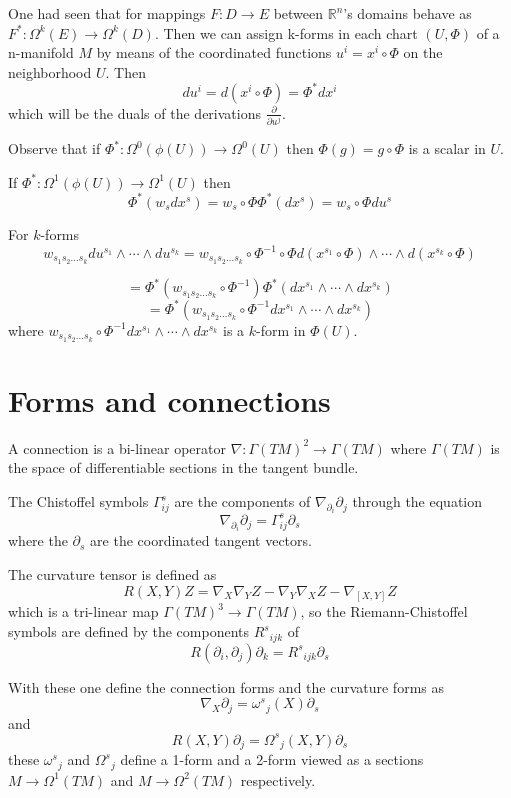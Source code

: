 \documentclass[12pt]{article}
\begin{document}
One had seen that for mappings $F\colon D\to E$ between $\mathbb{R}^n$'s domains behave as $F^*\colon \Omega^k(E)\to\Omega^k(D)$. 
Then we can assign k-forms in each chart $(U,\Phi)$ of a n-manifold $M$
by means of the coordinated functions $u^i=x^i\circ\Phi$ on the neighborhood $U$.
Then
$$du^i=d(x^i\circ\Phi)=\Phi^*dx^i$$
which will be the duals of the derivations
$\frac{\partial}{\partial u^j}$.  

Observe that if $\Phi^*\colon\Omega^0(\phi(U))\to\Omega^0(U)$
then $\Phi(g)=g\circ\Phi$ is a scalar in $U$.

If $\Phi^*\colon\Omega^1(\phi(U))\to\Omega^1(U)$ then
$$\Phi^*(w_sdx^s)=w_s\circ\Phi \Phi^*(dx^s)=w_s\circ\Phi du^s$$

For $k$-forms 
$$
w_{s_1s_2...s_k}du^{s_1}\wedge\cdots \wedge du^{s_k}=
w_{s_1s_2...s_k}\circ\Phi^{-1}\circ\Phi
d(x^{s_1}\circ\Phi)\wedge\cdots \wedge d(x^{s_k}\circ\Phi)$$

$$=\Phi^*(w_{s_1s_2...s_k}\circ\Phi^{-1})
\Phi^*(dx^{s_1}\wedge\cdots\wedge dx^{s_k})$$
$$=\Phi^*(w_{s_1s_2...s_k}\circ\Phi^{-1}dx^{s_1}\wedge\cdots\wedge dx^{s_k})$$
where $w_{s_1s_2...s_k}\circ\Phi^{-1}dx^{s_1}\wedge\cdots\wedge dx^{s_k}$ is a $k$-form in $\Phi(U)$.

\section{\bf Forms and connections}

A connection is a bi-linear operator $\nabla:\Gamma(TM)^2\to \Gamma(TM)$ where $\Gamma(TM)$ is the space of differentiable sections in the tangent bundle.

The Chistoffel symbols $\Gamma^s_{ij}$ are the components of $\nabla_{\partial_i}\partial_j$ through the equation
$$\nabla_{\partial_i}\partial_j=\Gamma^s_{ij}\partial_s$$
where the $\partial_s$ are the coordinated tangent vectors.

The curvature tensor is defined as 
$$R(X,Y)Z=\nabla_X\nabla_YZ-\nabla_Y\nabla_XZ-\nabla_{[X,Y]}Z$$
which is a tri-linear map $\Gamma(TM)^3\to \Gamma(TM)$, so the Riemann-Chistoffel symbols are defined by the components ${R^s}_{ijk}$ of
$$R(\partial_i,\partial_j)\partial_k={R^s}_{ijk}\partial_s$$

With these one define the connection forms and the curvature forms as
$$\nabla_X\partial_j={\omega^s}_j(X)\partial_s$$
and
$$R(X,Y)\partial_j={\Omega^s}_j(X,Y)\partial_s$$
these ${\omega^s}_j$ and ${\Omega^s}_j$ define a 1-form and a 2-form viewed as a sections $M\to \Omega^1(TM)$ and $M\to \Omega^2(TM)$ respectively.
\end{document}
